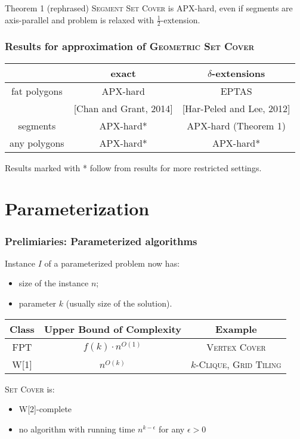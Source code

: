 \documentclass{beamer}
\begin{document}
\begin{frame}
\begin{block}{Theorem 1 (rephrased)}
	\textsc{Segment Set Cover} is APX-hard, even if segments are axis-parallel
	and problem is relaxed with $\frac{1}{2}$-extension.
\end{block}


\end{frame}


\begin{frame}
\frametitle{Results for approximation of \textsc{Geometric Set Cover}}
\begin{tabular}{|c|c|c|}
\hline
           & exact & $\delta$-extensions \\
\hline
fat polygons & APX-hard  &  EPTAS \\
& [Chan and Grant, 2014] & [Har-Peled and Lee, 2012] \\
\hline
segments & \textcolor{olivegreen}{APX-hard*} & \textcolor{olivegreen}{APX-hard (Theorem 1)} \\
\hline
any polygons & APX-hard* &  \textcolor{olivegreen}{APX-hard*} \\
\hline
\end{tabular}

\bigskip
Results marked with * follow from results for more restricted settings.

\end{frame}

\section{Parameterization}

\begin{frame}
\frametitle{Prelimiaries: Parameterized algorithms}
Instance $I$ of a parameterized problem now has:
\begin{itemize}
\item size of the instance $n$;
\item parameter $k$ (usually size of the solution).
\end{itemize}
\bigskip

\begin{tabular}{|c|c|c|}
\hline
\textbf{Class} & \textbf{Upper Bound of Complexity} & \textbf{Example}\\
\hline
FPT & $f(k) \cdot n^{O(1)}$ & \textsc{Vertex Cover}\\
\hline
W[1] & $n^{O(k)}$ & \textsc{$k$-Clique}, \textsc{Grid Tiling}\\
\hline
\end{tabular}

\pause

\bigskip
\textsc{Set Cover} is:
\begin{itemize}
\item W[2]-complete
\item no algorithm with running time $n^{k-\epsilon}$ for any $\epsilon > 0$
\end{itemize}
\end{frame}
\end{document}
